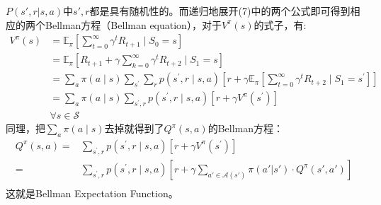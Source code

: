 \documentclass[a4paper]{article}
\begin{document}
$P(s',r|s,a)$中$s',r$都是具有随机性的。而递归地展开(7)中的两个公式即可得到相应的两个Bellman方程（Bellman equation），对于$V^\pi(s)$的式子，有:
\begin{equation}\begin{aligned}
V^{\pi}(s) &=\mathbb{E}_{\pi}\left[\sum_{t=0}^{\infty} \gamma^{t} R_{t+1} \mid S_{0}=s\right] \\
&=\mathbb{E}_{\pi}\left[R_{t+1}+\gamma \sum_{k=0}^{\infty} \gamma^{t} R_{t+2} \mid S_{1}=s\right] \\
&=\sum_{a} \pi(a \mid s) \sum_{s^{\prime}} \sum_{r} p\left(s^{\prime}, r \mid s, a\right)\left[r+\gamma \mathbb{E}_{\pi}\left[\sum_{t=0}^{\infty} \gamma^{t} R_{t+2} \mid S_{1}=s^{\prime}\right]\right] \\
&=\sum_{a} \pi(a \mid s) \sum_{s^{\prime}, r} p\left(s^{\prime}, r \mid s, a\right)\left[r+\gamma V^{\pi}\left(s^{\prime}\right)\right] \\
& \forall s \in \mathcal{S}
\end{aligned}\end{equation}
同理，把$\sum_{a} \pi(a \mid s)$去掉就得到了$Q^\pi(s,a)$的Bellman方程：
\begin{equation}
\begin{aligned}
    Q^\pi(s,a) = & \sum_{s^{\prime}, r} p\left(s^{\prime}, r \mid s, a\right)\left[r+\gamma V^{\pi}\left(s^{\prime}\right)\right] \\
    = &\sum_{s^{\prime}, r} p\left(s^{\prime}, r \mid s, a\right)\left[r+\gamma \sum_{a'\in\mathcal{A}(s')} \pi(a'|s')\cdot Q^\pi(s',a') \right] \\
\end{aligned}
\end{equation}
这就是Bellman Expectation Function。
\end{document}
